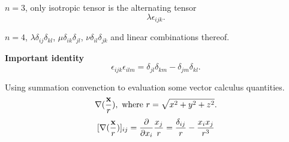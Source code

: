 \documentclass[12pt]{article}
\newcommand{\xx}{{\bf x}}
\newcommand{\bnabla}{{\bf \nabla}}
\begin{document}
$n=3$, only isotropic tensor is the alternating tensor
\[
\lambda\epsilon_{ijk}.
\]

$n=4$, $\lambda\delta_{ij}\delta_{kl}$,  $\mu\delta_{ik}\delta_{jl}$,  $\nu\delta_{il}\delta_{jk}$ and linear combinations thereof.

\bigskip
\bigskip

{\bf Important identity}
\[
\epsilon_{ijk}\epsilon_{ilm} = \delta_{jl}\delta_{km} - \delta_{jm}\delta_{kl}.
\]

Using summation convenction to evaluation some vector calculus quantities.
\[
\bnabla(\frac{\xx}{r}), \text{ where } r = \sqrt{x^2 + y^2 + z^2}.
\]
\[
[\bnabla(\frac{\xx}{r})]_{ij}= \frac{\partial}{\partial x_i}\frac{x_j}{r} = \frac{\delta_{ij}}{r} - \frac{x_ix_j}{r^3}
\]
\end{document}
